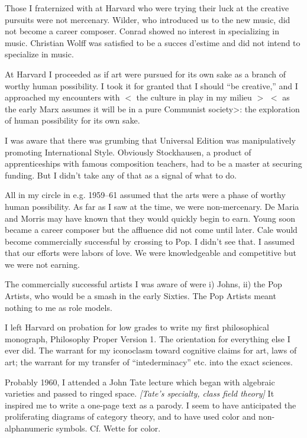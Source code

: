  

      Those I fraternized with at Harvard who were trying their luck at the creative pursuits were not mercenary.  Wilder, who introduced us to the new music, did not become a career composer.  Conrad showed no interest in specializing in music.  Christian Wolff was satisfied to be a succes d'estime and did not intend to specialize in music.

      At Harvard I proceeded as if art were pursued for its own sake as a branch of worthy human possibility.  I took it for granted that I should \enquote{be creative,} and I approached my encounters with $<$ the culture in play in my milieu $>$ $<$ as the early Marx assumes it will be in a pure Communist society>:  the exploration of human possibility for its own sake. 

      I was aware that there was grumbing that Universal Edition was manipulatively promoting International Style.  Obviously Stockhausen, a product of apprenticeships with famous composition teachers, had to be a master at securing funding.  But I didn't take any of that as a signal of what to do.

      All in my circle in e.g. 1959--61 assumed that the arts were a phase of worthy human possibility.  As far as I saw at the time, we were non-mercenary.  De Maria and Morris may have known that they would quickly begin to earn.  Young soon became a career composer but the affluence did not come until later.  Cale would become commercially successful by crossing to Pop.  I didn't see that.  I assumed that our efforts were labors of love.  We were knowledgeable and competitive but we were not earning.

      The commercially successful artists I was aware of were i) Johns, ii) the Pop Artists, who would be a smash in the early Sixties.  The Pop Artists meant nothing to me as role models.

      I left Harvard on probation for low grades to write my first philosophical monograph, Philosophy Proper Version 1.  The orientation for everything else I ever did.  The warrant for my iconoclasm toward cognitive claims for art, laws of art; the warrant for my transfer of \enquote{intederminacy} etc. into the exact sciences.

\Pb
 

      Probably 1960, I attended a John Tate lecture which began with algebraic varieties and passed to ringed space.  \textit{[Tate's specialty, class field theory]} It inspired me to write a one-page text as a parody.  I seem to have anticipated the proliferating diagrams of category theory, and to have used color and non-alphanumeric symbols.  Cf. Wette for color.

